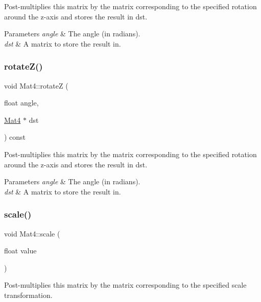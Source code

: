 Post-\/multiplies this matrix by the matrix corresponding to the specified rotation around the z-\/axis and stores the result in dst.


\begin{DoxyParams}{Parameters}
{\em angle} & The angle (in radians). \\
\hline
{\em dst} & A matrix to store the result in. \\
\hline
\end{DoxyParams}
\mbox{\label{classMat4_a9320c6f0c192eed1da05f8e1dcea7a1b}} 
\subsubsection{\texorpdfstring{rotate\+Z()}{rotateZ()}\hspace{0.1cm}{\footnotesize\ttfamily [4/4]}}
{\footnotesize\ttfamily void Mat4\+::rotateZ (\begin{DoxyParamCaption}\item[{float}]{angle,  }\item[{\hyperlink{classMat4}{Mat4} $\ast$}]{dst }\end{DoxyParamCaption}) const}

Post-\/multiplies this matrix by the matrix corresponding to the specified rotation around the z-\/axis and stores the result in dst.


\begin{DoxyParams}{Parameters}
{\em angle} & The angle (in radians). \\
\hline
{\em dst} & A matrix to store the result in. \\
\hline
\end{DoxyParams}
\mbox{\label{classMat4_a37c910140d6378e4ef7c7bb1e2d0296d}} 
\subsubsection{\texorpdfstring{scale()}{scale()}\hspace{0.1cm}{\footnotesize\ttfamily [1/12]}}
{\footnotesize\ttfamily void Mat4\+::scale (\begin{DoxyParamCaption}\item[{float}]{value }\end{DoxyParamCaption})}

Post-\/multiplies this matrix by the matrix corresponding to the specified scale transformation.


